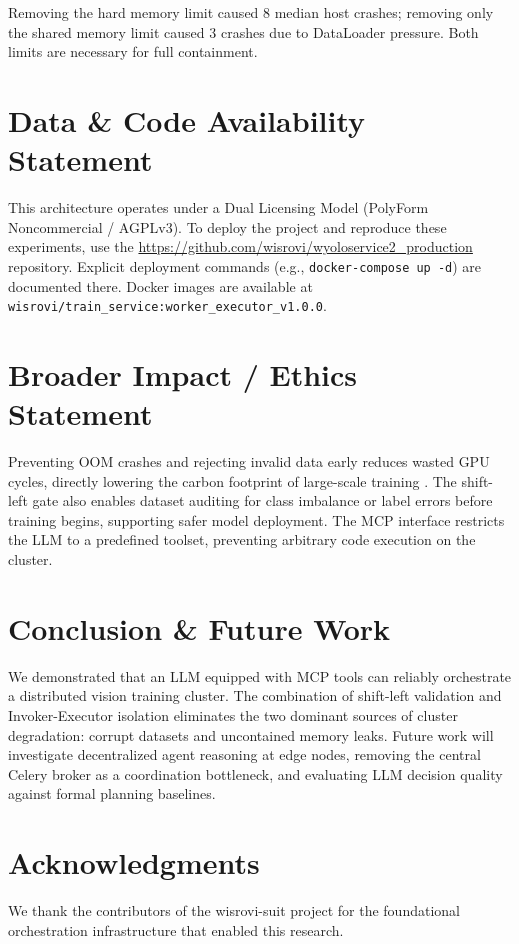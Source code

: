 \documentclass[10pt,twocolumn,letterpaper]{article}
\begin{document}
Removing the hard memory limit caused 8 median host crashes; removing only the shared memory limit caused 3 crashes due to DataLoader pressure. Both limits are necessary for full containment.

\section{Data \& Code Availability Statement}
This architecture operates under a Dual Licensing Model (PolyForm Noncommercial / AGPLv3). To deploy the project and reproduce these experiments, use the \url{https://github.com/wisrovi/wyoloservice2_production} repository. Explicit deployment commands (e.g., \texttt{docker-compose up -d}) are documented there. Docker images are available at \texttt{wisrovi/train\_service:worker\_executor\_v1.0.0}.

\section{Broader Impact / Ethics Statement}
Preventing OOM crashes and rejecting invalid data early reduces wasted GPU cycles, directly lowering the carbon footprint of large-scale training \cite{patterson2021carbon}. The shift-left gate also enables dataset auditing for class imbalance or label errors before training begins, supporting safer model deployment. The MCP interface restricts the LLM to a predefined toolset, preventing arbitrary code execution on the cluster.

\section{Conclusion \& Future Work}
We demonstrated that an LLM equipped with MCP tools can reliably orchestrate a distributed vision training cluster. The combination of shift-left validation and Invoker-Executor isolation eliminates the two dominant sources of cluster degradation: corrupt datasets and uncontained memory leaks. Future work will investigate decentralized agent reasoning at edge nodes, removing the central Celery broker as a coordination bottleneck, and evaluating LLM decision quality against formal planning baselines.

\section{Acknowledgments}
We thank the contributors of the wisrovi-suit project for the foundational orchestration infrastructure that enabled this research.



\end{document}

